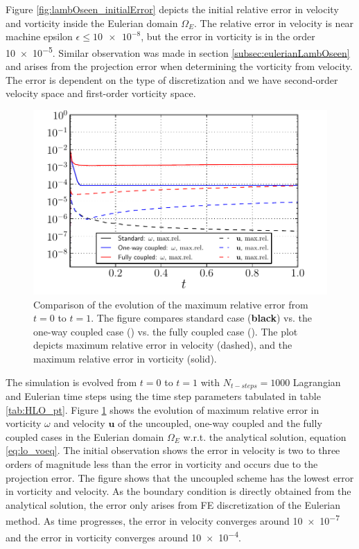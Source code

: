 Figure \ref{fig:lambOseen_initialError} depicts the initial relative error in velocity and vorticity inside the Eulerian domain $\Omega_E$. The relative error in velocity is near machine epsilon $\epsilon \le \num{10e-8}$, but the error in vorticity is in the order \num{10e-5}. Similar observation was made in section \ref{subsec:eulerianLambOseen} and arises from the projection error when determining the vorticity from velocity. The error is dependent on the type of discretization and we have second-order velocity space and first-order vorticity space. 

	\begin{figure}[!t]
	\centering
	\includegraphics[width=0.6\linewidth]{./figures/hybrid/lambOseen/lambOseen_comparision_compressed.pdf}
	\caption{Comparison of the evolution of the maximum relative error from $t=0$ to $t=1$. The figure compares standard case (\textbf{black}) vs. the one-way coupled case ({}) vs. the fully coupled case ({}). The plot depicts maximum relative error in velocity (dashed), and the maximum relative error in vorticity (solid).}
	\label{fig:lambOseen_comparison}
	\end{figure}

The simulation is evolved from $t=0$ to $t=1$ with $N_{t-steps} = 1000$ Lagrangian and Eulerian time steps using the time step parameters tabulated in table \ref{tab:HLO_pt}. Figure \ref{fig:lambOseen_comparison} shows the evolution of maximum relative error in vorticity $\omega$ and velocity $\mathbf{u}$ of the uncoupled, one-way coupled and the fully coupled cases in the Eulerian domain $\Omega_E$ w.r.t. the analytical solution, equation \ref{eq:lo_voeq}. The initial observation shows the error in velocity is two to three orders of magnitude less than the error in vorticity and occurs due to the projection error. The figure shows that the uncoupled scheme has the lowest error in vorticity and velocity. As the boundary condition is directly obtained from the analytical solution, the error only arises from FE discretization of the Eulerian method. As time progresses, the error in velocity converges around \num{10e-7} and the error in vorticity converges around \num{10e-4}.

